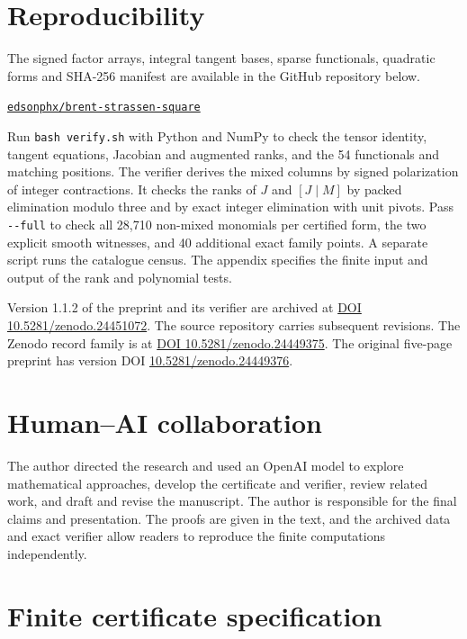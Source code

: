 \documentclass[11pt]{amsart}
\begin{document}
\section{Reproducibility}

The signed factor arrays, integral tangent bases, sparse functionals,
quadratic forms and SHA-256 manifest are available in the GitHub
repository below.
\begin{center}
\href{https://github.com/edsonphx/brent-strassen-square}{\texttt{edsonphx/brent-strassen-square}}
\end{center}

Run \texttt{bash verify.sh} with Python and NumPy to check the tensor
identity, tangent equations, Jacobian and augmented ranks, and
the 54 functionals and matching positions. The verifier derives
the mixed columns by signed polarization of integer contractions.
It checks the ranks of $J$ and $[J\mid M]$ by packed elimination
modulo three and by exact integer elimination with unit pivots.
Pass \verb|--full| to check all 28,710 non-mixed monomials per
certified form, the two explicit smooth witnesses, and 40
additional exact family points. A separate script runs the
catalogue census. The appendix specifies the finite input and
output of the rank and polynomial tests.

Version 1.1.2 of the preprint and its verifier are archived at
\href{https://doi.org/10.5281/zenodo.24451072}{DOI 10.5281/zenodo.24451072}.
The source repository carries subsequent revisions.
The Zenodo record family is at
\href{https://doi.org/10.5281/zenodo.24449375}{DOI 10.5281/zenodo.24449375}.
The original five-page preprint has version DOI
\href{https://doi.org/10.5281/zenodo.24449376}{10.5281/zenodo.24449376}.

\section*{Human--AI collaboration}

The author directed the research and used an OpenAI model
to explore mathematical approaches, develop the certificate
and verifier, review related work, and draft and revise the
manuscript. The author is responsible for the final claims and
presentation. The proofs are given in the text, and the archived
data and exact verifier allow readers to reproduce the finite
computations independently.

\appendix
\section{Finite certificate specification}\label{sec:certificate}
\end{document}
